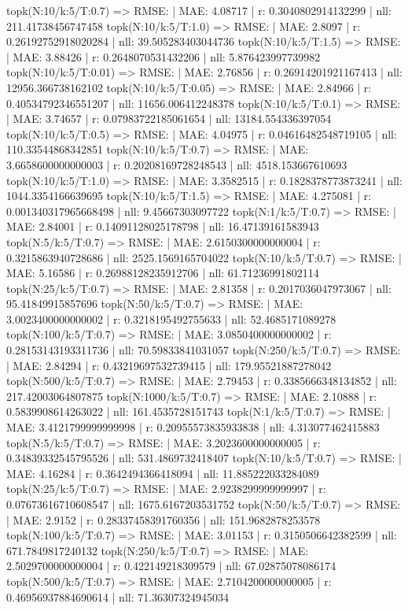 topk(N:10/k:5/T:0.7) => RMSE: | MAE: 4.08717 | r: 0.3040802914132299 | nll: 211.41738456747458
topk(N:10/k:5/T:1.0) => RMSE: | MAE: 2.8097 | r: 0.26192752918020284 | nll: 39.505283403044736
topk(N:10/k:5/T:1.5) => RMSE: | MAE: 3.88426 | r: 0.2648070531432206 | nll: 5.876423997739982
topk(N:10/k:5/T:0.01) => RMSE: | MAE: 2.76856 | r: 0.26914201921167413 | nll: 12956.366738162102
topk(N:10/k:5/T:0.05) => RMSE: | MAE: 2.84966 | r: 0.40534792346551207 | nll: 11656.006412248378
topk(N:10/k:5/T:0.1) => RMSE: | MAE: 3.74657 | r: 0.07983722185061654 | nll: 13184.554336397054
topk(N:10/k:5/T:0.5) => RMSE: | MAE: 4.04975 | r: 0.04616482548719105 | nll: 110.33544868342851
topk(N:10/k:5/T:0.7) => RMSE: | MAE: 3.6658600000000003 | r: 0.20208169728248543 | nll: 4518.153667610693
topk(N:10/k:5/T:1.0) => RMSE: | MAE: 3.3582515 | r: 0.1828378773873241 | nll: 1044.3354166639695
topk(N:10/k:5/T:1.5) => RMSE: | MAE: 4.275081 | r: 0.001340317965668498 | nll: 9.45667303097722
topk(N:1/k:5/T:0.7) => RMSE: | MAE: 2.84001 | r: 0.14091128025178798 | nll: 16.47139161583943
topk(N:5/k:5/T:0.7) => RMSE: | MAE: 2.6150300000000004 | r: 0.3215863940728686 | nll: 2525.1569165704022
topk(N:10/k:5/T:0.7) => RMSE: | MAE: 5.16586 | r: 0.26988128235912706 | nll: 61.71236991802114
topk(N:25/k:5/T:0.7) => RMSE: | MAE: 2.81358 | r: 0.2017036047973067 | nll: 95.41849915857696
topk(N:50/k:5/T:0.7) => RMSE: | MAE: 3.0023400000000002 | r: 0.3218195492755633 | nll: 52.4685171089278
topk(N:100/k:5/T:0.7) => RMSE: | MAE: 3.0850400000000002 | r: 0.28153143193311736 | nll: 70.59833841031057
topk(N:250/k:5/T:0.7) => RMSE: | MAE: 2.84294 | r: 0.43219697532739415 | nll: 179.95521887278042
topk(N:500/k:5/T:0.7) => RMSE: | MAE: 2.79453 | r: 0.3385666348134852 | nll: 217.42003064807875
topk(N:1000/k:5/T:0.7) => RMSE: | MAE: 2.10888 | r: 0.5839908614263022 | nll: 161.4535728151743
topk(N:1/k:5/T:0.7) => RMSE: | MAE: 3.4121799999999998 | r: 0.20955573835933838 | nll: 4.313077462415883
topk(N:5/k:5/T:0.7) => RMSE: | MAE: 3.2023600000000005 | r: 0.34839332545795526 | nll: 531.4869732418407
topk(N:10/k:5/T:0.7) => RMSE: | MAE: 4.16284 | r: 0.3642494366418094 | nll: 11.885222033284089
topk(N:25/k:5/T:0.7) => RMSE: | MAE: 2.9238299999999997 | r: 0.07673616710608547 | nll: 1675.6167203531752
topk(N:50/k:5/T:0.7) => RMSE: | MAE: 2.9152 | r: 0.28337458391760356 | nll: 151.9682878253578
topk(N:100/k:5/T:0.7) => RMSE: | MAE: 3.01153 | r: 0.3150506642382599 | nll: 671.7849817240132
topk(N:250/k:5/T:0.7) => RMSE: | MAE: 2.5029700000000004 | r: 0.422149218309579 | nll: 67.02875078086174
topk(N:500/k:5/T:0.7) => RMSE: | MAE: 2.7104200000000005 | r: 0.46956937884690614 | nll: 71.36307324945034
